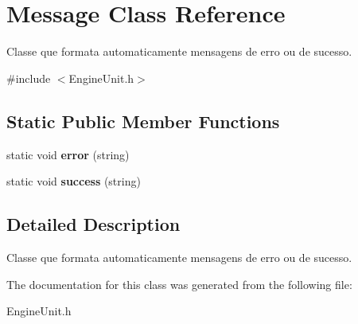 \hypertarget{classMessage}{\section{Message Class Reference}
\label{d6/d28/classMessage}
}


Classe que formata automaticamente mensagens de erro ou de sucesso.  




{\ttfamily \#include $<$Engine\-Unit.\-h$>$}

\subsection*{Static Public Member Functions}
\begin{DoxyCompactItemize}
\item 
\hypertarget{classMessage_ac394c1f98e51507ba63a19941cde1534}{static void {\bfseries error} (string)}\label{d6/d28/classMessage_ac394c1f98e51507ba63a19941cde1534}

\item 
\hypertarget{classMessage_a970338c7ef7f68efb16093612c1844ca}{static void {\bfseries success} (string)}\label{d6/d28/classMessage_a970338c7ef7f68efb16093612c1844ca}

\end{DoxyCompactItemize}


\subsection{Detailed Description}
Classe que formata automaticamente mensagens de erro ou de sucesso. 

The documentation for this class was generated from the following file\-:\begin{DoxyCompactItemize}
\item 
Engine\-Unit.\-h\end{DoxyCompactItemize}
